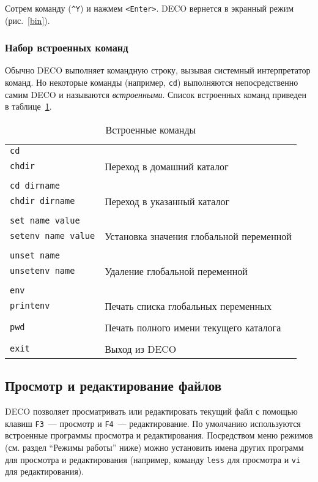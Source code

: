 Сотрем команду ({\tt \^{}Y})
и нажмем {\tt <Enter>}. DECO вернется в экранный режим (рис.~\ref{bin}).

\subsubsection{Набор встроенных команд}

Обычно DECO выполняет командную строку, вызывая системный
интерпретатор команд. Но некоторые команды (например, {\tt cd})
выполняются непосредственно самим DECO и называются {\em встроенными}.
Список встроенных команд приведен в таблице~\ref{builtin}.

\begin{table}[bp]
\begin{center}
\begin{tabular}{|ll|}
\hline
{\tt cd} & \\
{\tt chdir} & Переход в домашний каталог \\
& \\
{\tt cd dirname} & \\
{\tt chdir dirname} & Переход в указанный каталог \\
& \\
{\tt set name value} & \\
{\tt setenv name value} & Установка значения глобальной переменной \\
& \\
{\tt unset name} & \\
{\tt unsetenv name} & Удаление глобальной переменной \\
& \\
{\tt env} & \\
{\tt printenv} & Печать списка глобальных переменных \\
& \\
{\tt pwd} & Печать полного имени текущего каталога \\
& \\
{\tt exit} & Выход из DECO \\
\hline
\end{tabular}
\caption{Встроенные команды}
\label{builtin}
\end{center}
\end{table}

\subsection{Просмотр и редактирование файлов}

DECO позволяет просматривать или редактировать текущий файл
с помощью клавиш {\tt F3}~--- просмотр и {\tt F4}~--- редактирование.
По умолчанию используются встроенные программы просмотра и
редактирования. Посредством меню режимов (см. раздел ``Режимы работы'' ниже)
можно установить имена других программ для просмотра и редактирования (например,
команду {\tt less} для просмотра и {\tt vi} для редактирования).

